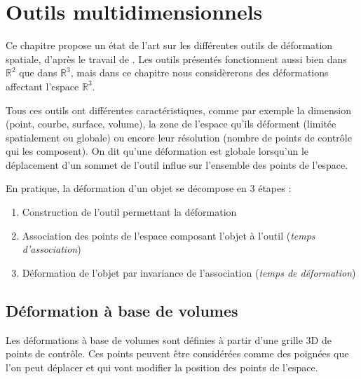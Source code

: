 

\chapter{Outils multidimensionnels}

\graphicspath{{Chapter1/Chapter1Figs/PNG/}{Chapter1/Chapter1Figs/PDF/}{Chapter1/Chapter1Figs/}}

Ce chapitre propose un état de l'art sur les différentes outils de déformation
spatiale, d'après le travail de \cite{GB08}. Les outils présentés fonctionnent
aussi bien dans $\mathbb{R}^2$ que dans $\mathbb{R}^3$, mais dans ce chapitre
nous considèrerons des déformations affectant l'espace $\mathbb{R}^3$.

Tous ces outils ont différentes caractéristiques, comme par exemple la
dimension (point, courbe, surface, volume), la zone de l'espace qu'ils
déforment (limitée spatialement ou globale) ou encore leur résolution (nombre
de points de contrôle qui les composent). On dit qu'une déformation est
globale lorsqu'un le déplacement d'un sommet de l'outil influe sur l'ensemble
des points de l'espace.

En pratique, la déformation d'un objet se décompose en 3 étapes :
\begin{enumerate}

\item Construction de l'outil permettant la déformation

\item Association des points de l'espace composant l'objet à l'outil
(\textit{temps d'association})

\item Déformation de l'objet par invariance de l'association (\textit{temps de
déformation})

\end{enumerate} 

\section{Déformation à base de volumes}

Les déformations à base de volumes sont définies à partir d'une grille 3D de
points de contrôle. Ces points peuvent être considérées comme des poignées que
l'on peut déplacer et qui vont modifier la position des points de l'espace.


